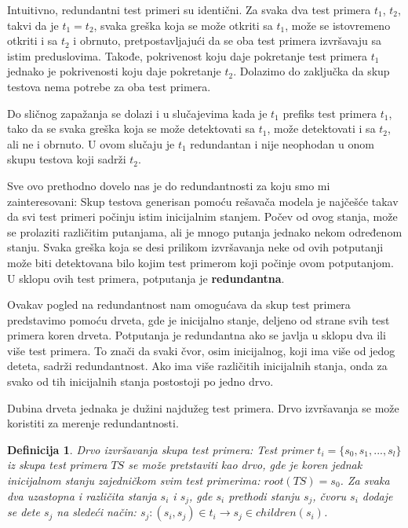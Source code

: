 \documentclass[a4paper]{article}
\newtheorem{definition}{Definicija}[section]
\begin{document}
Intuitivno, redundantni test primeri su identični. Za svaka dva test primera $t_1$, $t_2$, takvi da je $ t_1 = t_2$, svaka greška koja se može otkriti sa $t_1$, može se istovremeno otkriti i sa $t_2$ i obrnuto, pretpostavljajući da se oba test primera izvršavaju sa istim preduslovima. Takođe, pokrivenost koju daje pokretanje test primera $t_1$ jednako je pokrivenosti koju daje pokretanje $t_2$. Dolazimo do zaključka da skup testova nema potrebe za oba test primera.

Do sličnog zapažanja se dolazi i u slučajevima kada je $t_1$ prefiks test primera $t_1$, tako da se svaka greška koja se može detektovati sa $t_1$, može detektovati i sa $t_2$, ali ne i obrnuto. U ovom slučaju je $t_1$ redundantan i nije neophodan u onom skupu testova koji sadrži $t_2$.

Sve ovo prethodno dovelo nas je do redundantnosti za koju smo mi zainteresovani: Skup testova generisan pomoću rešavača modela je najčešće takav da svi test primeri počinju istim inicijalnim stanjem. Počev od ovog stanja, može se prolaziti različitim putanjama, ali je mnogo putanja jednako nekom određenom stanju. 
Svaka greška koja se desi prilikom izvršavanja neke od ovih potputanji može biti detektovana bilo kojim test primerom koji počinje ovom potputanjom. U sklopu ovih test primera, potputanja je \textbf{redundantna}.

Ovakav pogled na redundantnost nam omogućava da skup test primera predstavimo pomoću drveta, gde je inicijalno stanje, deljeno od strane svih test primera koren drveta. Potputanja je redundantna ako se javlja u sklopu dva ili više test primera. To znači da svaki čvor, osim inicijalnog, koji ima više od jedog deteta, sadrži redundantnost. Ako ima više različitih inicijalnih stanja, onda za svako od tih inicijalnih stanja postostoji po jedno drvo.

Dubina drveta jednaka je dužini najdužeg test primera. Drvo izvršavanja se može koristiti za merenje redundantnosti.

\begin{definition}{Drvo izvršavanja skupa test primera:}
Test primer $t_i = \{s_0, s_1, ..., s_l\}$ iz skupa test primera $TS$ se može pretstaviti kao drvo, gde je koren jednak inicijalnom stanju zajedničkom svim test primerima: $root(TS) = s_0$. Za svaka dva uzastopna i različita stanja $s_i$ i $s_j$, gde $s_i$ prethodi stanju $s_j$, čvoru $s_i$ dodaje se dete $s_j$ na sledeći način: $s_j: (s_i, s_j) \in t_i \rightarrow s_j \in children(s_i)$.
\end{definition}
\end{document}

